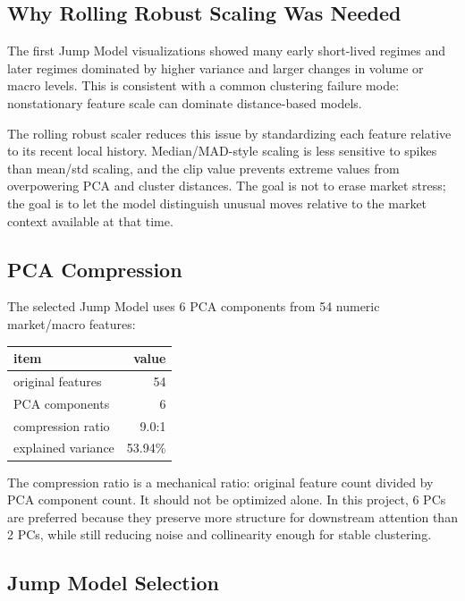 \subsection{Why Rolling Robust Scaling Was
Needed}\label{why-rolling-robust-scaling-was-needed}

The first Jump Model visualizations showed many early short-lived
regimes and later regimes dominated by higher variance and larger
changes in volume or macro levels. This is consistent with a common
clustering failure mode: nonstationary feature scale can dominate
distance-based models.

The rolling robust scaler reduces this issue by standardizing each
feature relative to its recent local history. Median/MAD-style scaling
is less sensitive to spikes than mean/std scaling, and the clip value
prevents extreme values from overpowering PCA and cluster distances. The
goal is not to erase market stress; the goal is to let the model
distinguish unusual moves relative to the market context available at
that time.

\subsection{PCA Compression}\label{pca-compression}

The selected Jump Model uses 6 PCA components from 54 numeric
market/macro features:

{\def\LTcaptype{none} %
\begin{longtable}[]{@{}lr@{}}
\toprule\noalign{}
item & value \\
\midrule\noalign{}
\endhead
\bottomrule\noalign{}
\endlastfoot
original features & 54 \\
PCA components & 6 \\
compression ratio & 9.0:1 \\
explained variance & 53.94\% \\
\end{longtable}
}

The compression ratio is a mechanical ratio: original feature count
divided by PCA component count. It should not be optimized alone. In
this project, 6 PCs are preferred because they preserve more structure
for downstream attention than 2 PCs, while still reducing noise and
collinearity enough for stable clustering.

\subsection{Jump Model Selection}\label{jump-model-selection}

